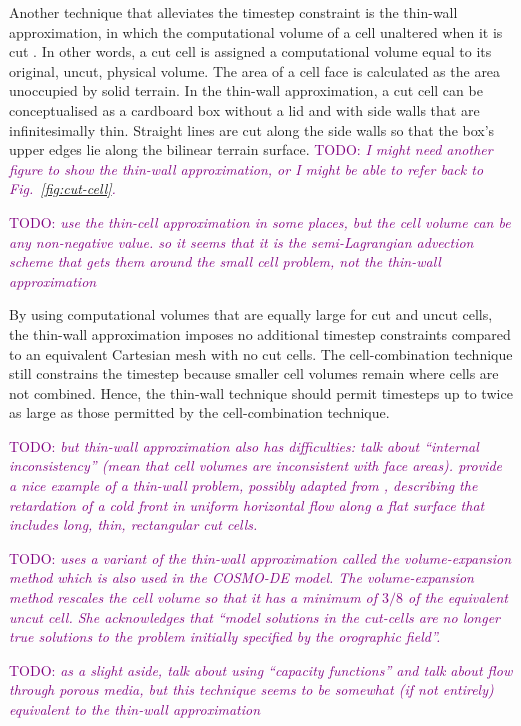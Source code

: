 \documentclass{article}
\newcommand{\TODO}[1]{\textcolor{purple}{TODO: \emph{#1}}}
\begin{document}
Another technique that alleviates the timestep constraint is the thin-wall approximation, in which the computational volume of a cell unaltered when it is cut \citep{steppeler2002}.  In other words, a cut cell is assigned a computational volume equal to its original, uncut, physical volume.  The area of a cell face is calculated as the area unoccupied by solid terrain.  In the thin-wall approximation, a cut cell can be conceptualised as a cardboard box without a lid and with side walls that are infinitesimally thin.  Straight lines are cut along the side walls so that the box's upper edges lie along the bilinear terrain surface.  \TODO{I might need another figure to show the thin-wall approximation, or I might be able to refer back to Fig.~\ref{fig:cut-cell}.}

\TODO{\citet{bonaventura2000} use the thin-cell approximation in some places, but the cell volume can be any non-negative value.  so it seems that it is the semi-Lagrangian advection scheme that gets them around the small cell problem, not the thin-wall approximation}

By using computational volumes that are equally large for cut and uncut cells, the thin-wall approximation imposes no additional timestep constraints compared to an equivalent Cartesian mesh with no cut cells.  The cell-combination technique still constrains the timestep because smaller cell volumes remain where cells are not combined.  Hence, the thin-wall technique should permit timesteps up to twice as large as those permitted by the cell-combination technique.

\TODO{but thin-wall approximation also has difficulties: \citet{yamazaki-satomura2010} talk about ``internal inconsistency'' (mean that cell volumes are inconsistent with face areas).  \citet{walko-avissar2008b} provide a nice example of a thin-wall problem, possibly adapted from \citet{calhoun-leveque2000}, describing the retardation of a cold front in uniform horizontal flow along a flat surface that includes long, thin, rectangular cut cells.}

\TODO{\citet{lock2008} uses a variant of the thin-wall approximation called the volume-expansion method which is also used in the COSMO-DE model.  The volume-expansion method rescales the cell volume so that it has a minimum of $3/8$ of the equivalent uncut cell.  She acknowledges that ``model solutions in the cut-cells are no longer true solutions to the problem initially specified by the orographic field''.}

\TODO{as a slight aside, \citet{calhoun-leveque2000} talk about using ``capacity functions'' and talk about flow through porous media, but this technique seems to be somewhat (if not entirely) equivalent to the thin-wall approximation}
\end{document}
